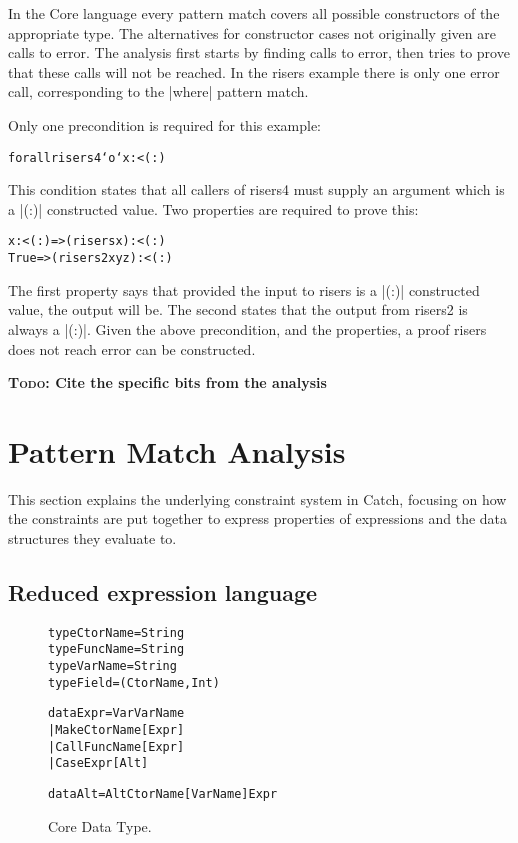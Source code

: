 \documentclass[preprint]{sigplanconf}
\newcommand{\C}[1]{\textsf{#1}}
\newcommand{\todo}[1]{\textbf{\textsc{Todo:} #1}}
\newenvironment{code}{\begin{alltt}\small}{\end{alltt}}
\begin{document}
In the Core language every pattern match covers all possible constructors of the appropriate type. The alternatives for constructor cases not originally given are calls to \C{error}. The analysis first starts by finding calls to \C{error}, then tries to prove that these calls will not be reached. In the \C{risers} example there is only one \C{error} call, corresponding to the |where| pattern match.

Only one precondition is required for this example:

\begin{code}
forall risers4 `o` x :< (:)
\end{code}

This condition states that all callers of \C{risers4} must supply an argument which is a |(:)| constructed value. Two properties are required to prove this:

\begin{code}
x :< (:)  => (risers x       ) :< (:)
True      => (risers2 x y z  ) :< (:)
\end{code}

The first property says that provided the input to \C{risers} is a |(:)| constructed value, the output will be. The second states that the output from \C{risers2} is always a |(:)|. Given the above precondition, and the properties, a proof \C{risers} does not reach \C{error} can be constructed.

\todo{Cite the specific bits from the analysis}

\section{Pattern Match Analysis}
\label{sec:manipulate}

This section explains the underlying constraint system in Catch, focusing on how the constraints are put together to express properties of expressions and the data structures they evaluate to.

\subsection{Reduced expression language}
\label{sec:core}

\begin{figure}
\begin{code}
type CtorName  =  String
type FuncName  =  String
type VarName   =  String
type Field     =  (CtorName, Int)

data Expr  =  Var   VarName
           |  Make  CtorName  [Expr]
           |  Call  FuncName  [Expr]
           |  Case  Expr      [Alt]

data Alt = Alt CtorName [VarName] Expr
\end{code}
\caption{Core Data Type.}
\label{fig:core}
\end{figure}
\end{document}
